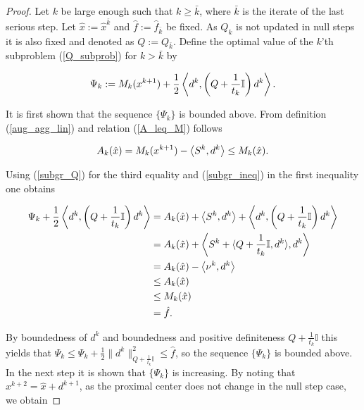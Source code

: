 \begin{proof}
	Let \(k\) be large enough such that \(k \geq \bar{k}\), where \(\bar{k}\) is the iterate of the last serious step. Let \(\hat{x}:= \hat{x}^{\bar{k}} \) and \(\hat{f}:= \hat{f}_{\bar{k}}\) be fixed. As \(Q_k\) is not updated in null steps it is also fixed and denoted as \(Q := Q_{\bar{k}}\).
	Define the optimal value of the \(k\)'th subproblem  (\ref{Q_subprob}) for \(k > \bar{k}\) by 
	
	\begin{equation}
		\Psi_k := M_k(x^{k+1})+\frac{1}{2}\left\langle d^k,\left(Q+\frac{1}{t_k}\mathbb{I}\right)d^k\right\rangle.
		\label{Psi}
	\end{equation}
	
	It is first shown that the sequence \(\{\Psi_k\}\) is bounded above.
	From definition (\ref{aug_agg_lin}) and relation (\ref{A_leq_M}) follows

	
	\begin{equation*}
		A_k(\hat{x}) = M_k(x^{k+1})-\left\langle S^k,d^k \right\rangle \leq M_k(\hat{x}).
	\end{equation*}
	
Using (\ref{subgr_Q}) for the third equality and (\ref{subgr_ineq}) in the first inequality one obtains
	
	\begin{align*}
		\Psi_k+\frac{1}{2}\left\langle d^{k},\left(Q+\frac{1}{t_k}\mathbb{I}\right)d^k\right\rangle &= A_k(\hat{x})+\left\langle S^k,d^k\right\rangle + \left\langle d^{k},\left(Q+\frac{1}{t_k}\mathbb{I}\right)d^k\right\rangle \\
		&= A_k(\hat{x}) + \left\langle S^k + \langle Q+\frac{1}{t_k}\mathbb{I},d^k \rangle,d^k \right\rangle \\
		&= A_k(\hat{x})-\left\langle \nu^k,d^k \right\rangle \\
		&\leq A_k(\hat{x}) \\
		&\leq M_k(\hat{x}) \\
		&= \hat{f}.
	\end{align*}
	
By boundedness of \(d^k\) and boundedness and positive definiteness \(Q+\frac{1}{t_k}\mathbb{I}\) this yields that \(\Psi_k \leq \Psi_k + \frac{1}{2} \|d^k\|^2_{Q+\frac{1}{t_k}\mathbb{I}} \leq \hat{f}\), so the sequence \(\{\Psi_k\}\) is bounded above.
	In the next step it is shown that \(\{\Psi_k\}\) is increasing. By noting that \(x^{k+2} = \hat{x}+d^{k+1}\), as the proximal center does not change in the null step case, we obtain
	

\end{proof}

